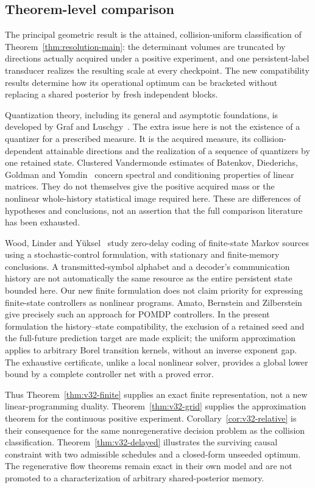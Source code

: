 \subsection{Theorem-level comparison}
\label{sec:v32-positioning}
The principal geometric result is the attained,
collision-uniform classification of
Theorem~\ref{thm:resolution-main}: the determinant volumes are truncated
by directions actually acquired under a positive experiment, and one
persistent-label transducer realizes the resulting scale at every
checkpoint. The new compatibility results determine how its operational
optimum can be bracketed without replacing a shared posterior by fresh
independent blocks.

Quantization theory, including its general and asymptotic foundations,
is developed by Graf and Luschgy~\cite{GrafLuschgy2000}. The extra issue
here is not the existence of a quantizer for a prescribed measure. It is
the acquired measure, its collision-dependent attainable directions and
the realization of a sequence of quantizers by one retained state.
Clustered Vandermonde estimates of Batenkov, Diederichs, Goldman and
Yomdin~\cite{V32Batenkov} concern spectral and conditioning properties
of linear matrices. They do not themselves give the positive acquired
mass or the nonlinear whole-history statistical image required here.
These are differences of hypotheses and conclusions, not an assertion
that the full comparison literature has been exhausted.

Wood, Linder and Y\"uksel~\cite{V32Wood} study zero-delay coding of
finite-state Markov sources using a stochastic-control formulation, with
stationary and finite-memory conclusions. A transmitted-symbol alphabet
and a decoder's communication history are not automatically the same
resource as the entire persistent state bounded here. Our new finite
formulation does not claim priority for expressing finite-state
controllers as nonlinear programs. Amato, Bernstein and
Zilberstein~\cite{V32Amato} give precisely such an approach for POMDP
controllers. In the present formulation the history--state compatibility,
the exclusion of a retained seed and the full-future prediction target
are made explicit; the uniform approximation applies to arbitrary Borel
transition kernels, without an inverse exponent gap. The exhaustive
certificate, unlike a local nonlinear solver, provides a global lower
bound by a complete controller net with a proved error.

Thus Theorem~\ref{thm:v32-finite} supplies an exact finite representation,
not a new linear-programming duality. Theorem~\ref{thm:v32-grid} supplies
the approximation theorem for the continuous positive experiment.
Corollary~\ref{cor:v32-relative} is their consequence for the same
nonregenerative decision problem as the collision classification.
Theorem~\ref{thm:v32-delayed} illustrates the surviving causal constraint
with two admissible schedules and a closed-form unseeded optimum.
The regenerative flow theorems remain exact in their own model and are
not promoted to a characterization of arbitrary shared-posterior memory.
